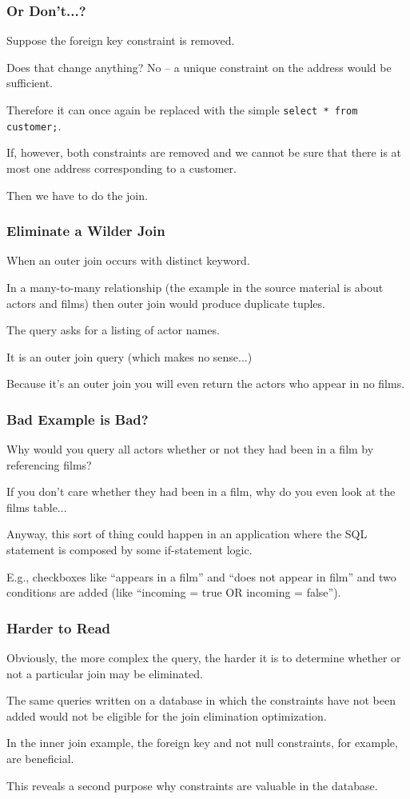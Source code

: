 \begin{frame}
\frametitle{Or Don't...?}

Suppose the foreign key constraint is removed. 

Does that change anything? No -- a unique constraint on the address would be sufficient. 

Therefore it can once again be replaced with the simple \texttt{select * from customer;}.

If, however, both constraints are removed and we cannot be sure that there is at most one address corresponding to a customer.

Then we have to do the join.


\end{frame}

\begin{frame}
\frametitle{Eliminate a Wilder Join}

When an outer join occurs with distinct keyword.

In a many-to-many relationship (the example in the source material is about actors and films) then outer join would produce duplicate tuples. 

The query asks for a listing of actor names. 

It is an outer join query (which makes no sense...) 

Because it's an outer join you will even return the actors who appear in no films.

\end{frame}


\begin{frame}
\frametitle{Bad Example is Bad?}

Why would you query all actors whether or not they had been in a film by referencing films? 

If you don't care whether they had been in a film, why do you even look at the films table...

Anyway, this sort of thing could happen in an application where the SQL statement is composed by some if-statement logic.

E.g., checkboxes like ``appears in a film'' and ``does not appear in film'' and two conditions are added (like ``incoming = true OR incoming = false'').

\end{frame}

\begin{frame}
\frametitle{Harder to Read}
Obviously, the more complex the query, the harder it is to determine whether or not a particular join may be eliminated. 

The same queries written on a database in which the constraints have not been added would not be eligible for the join elimination optimization. 

In the inner join example, the foreign key and not null constraints, for example, are beneficial. 

This reveals a second purpose why constraints are valuable in the database.

\end{frame}

